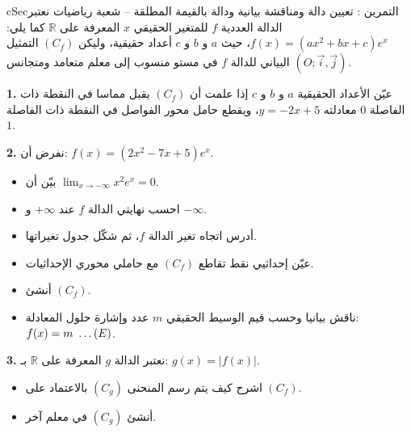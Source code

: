 \documentclass[12pt,a4paper]{article}
\newenvironment{BOX}[2]{\begin{otherlanguage}{english}\begin{arbox}{#1}{#2}}{\end{arbox}\end{otherlanguage}}
\newcounter{exo}
\newenvironment{tamrin}[1]{\stepcounter{exo}\begin{BOX}{cSec}{التمرين \theexo: #1}}{\end{BOX}}
\renewcommand{\ldots}{\mathinner{\ldotp\ldotp\ldotp}}
\newcommand{\R}{\mathbb{R}}
\newenvironment{sq}{\begin{itemize}[leftmargin=2.4em,itemsep=3pt]}{\end{itemize}}
\newcommand{\qa}{\item[(أ)]}\newcommand{\qb}{\item[(ب)]}\newcommand{\qc}{\item[(جـ)]}\newcommand{\qd}{\item[(د)]}\newcommand{\qe}{\item[(هـ)]}
\newcommand{\QQ}[1]{\par\smallskip\textbf{#1.} }
\begin{document}
\begin{tamrin}{تعيين دالة ومناقشة بيانية ودالة بالقيمة المطلقة -- شعبة رياضيات}
نعتبر الدالة العددية $f$ للمتغير الحقيقي $x$ المعرفة على $\R$ كما يلي: $f(x)=\left(ax^{2}+bx+c\right)e^{x}$، حيث $a$ و $b$ و $c$ أعداد حقيقية، وليكن $(C_f)$ التمثيل البياني للدالة $f$ في مستو منسوب إلى معلم متعامد ومتجانس $\left(O;\vec i,\vec j\right)$.
\QQ{1} عيّن الأعداد الحقيقية $a$ و $b$ و $c$ إذا علمت أن $(C_f)$ يقبل مماسا في النقطة ذات الفاصلة $0$ معادلته $y=-2x+5$، ويقطع حامل محور الفواصل في النقطة ذات الفاصلة $1$.
\QQ{2} نفرض أن: $f(x)=\left(2x^{2}-7x+5\right)e^{x}$.
\begin{sq}
\qa بيّن أن $\displaystyle\lim_{x\to-\infty}x^{2}e^{x}=0$.
\qb احسب نهايتي الدالة $f$ عند $+\infty$ و $-\infty$.
\qc أدرس اتجاه تغير الدالة $f$، ثم شكّل جدول تغيراتها.
\qd عيّن إحداثيي نقط تقاطع $(C_f)$ مع حاملي محوري الإحداثيات.
\qe أنشئ $(C_f)$.
\item[(و)] ناقش بيانيا وحسب قيم الوسيط الحقيقي $m$ عدد وإشارة حلول المعادلة: $f(x)=m\ \ldots(E)$.
\end{sq}
\QQ{3} نعتبر الدالة $g$ المعرفة على $\R$ بـ: $g(x)=\left|f(x)\right|$.
\begin{sq}
\qa اشرح كيف يتم رسم المنحنى $(C_g)$ بالاعتماد على $(C_f)$.
\qb أنشئ $(C_g)$ في معلم آخر.
\end{sq}
\end{tamrin}
\end{document}
